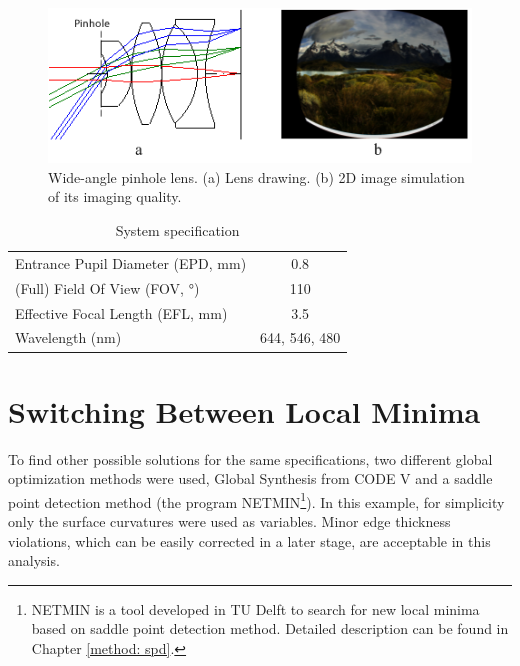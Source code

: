 \begin{figure}[h!]
    \centering
    \includegraphics[scale=0.95]{chapter-3/figures/WidePinLens.png}
    \caption{Wide-angle pinhole lens. (a) Lens drawing. (b) 2D image simulation of its imaging quality.}
    \label{fig:widepinLens}
\end{figure}

\setlength{\arrayrulewidth}{.5mm}
\setlength{\tabcolsep}{18pt}
\renewcommand{\arraystretch}{1.2}
\begin{table}[h!]
    \centering
    \captionsetup{justification=centering}
    \caption{System specification}
    \label{table: sysspec}
    \vspace{-1em}
    \begin{tabular}{ p{20em} c }
    \hline 
    Entrance Pupil Diameter (EPD, mm) & 0.8\\
    (Full) Field Of View (FOV, °) & 110\\
    Effective Focal Length (EFL, mm) & 3.5\\
    Wavelength (nm) & 644, 546, 480\\
    \hline
    \end{tabular}
\end{table}



\section{Switching Between Local Minima}

To find other possible solutions for the same specifications, two different global optimization methods were used, Global Synthesis from CODE V \cite{KuperGO1992}\cite{RogersGO2006} and a saddle point detection method (the program NETMIN\footnote{NETMIN is a tool developed in TU Delft to search for new local minima based on saddle point detection method. Detailed description can be found in Chapter \ref{method: spd}.}). In this example, for simplicity only the surface curvatures were used as variables. Minor edge thickness violations, which can be easily corrected in a later stage, are acceptable in this analysis. 

